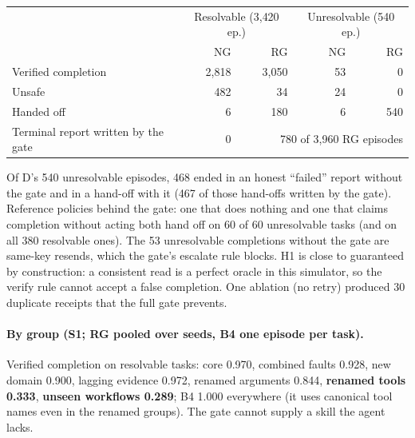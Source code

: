 \documentclass[11pt]{article}
\begin{document}
\begin{center}\footnotesize
\begin{tabular}{@{}lrrrr@{}}
\toprule
 & \multicolumn{2}{c}{Resolvable (3{,}420 ep.)} & \multicolumn{2}{c}{Unresolvable (540 ep.)} \\
 & NG & RG & NG & RG \\
\midrule
Verified completion & 2{,}818 & 3{,}050 & 53 & 0 \\
Unsafe & 482 & 34 & 24 & 0 \\
Handed off & 6 & 180 & 6 & 540 \\
Terminal report written by the gate & 0 & \multicolumn{3}{r}{780 of 3{,}960 RG episodes} \\
\bottomrule
\end{tabular}
\end{center}
Of D's 540 unresolvable episodes, 468 ended in an honest ``failed'' report without the gate and in a hand-off with it
(467 of those hand-offs written by the gate). Reference policies behind the gate: one that does nothing and one that
claims completion without acting both hand off on 60 of 60 unresolvable tasks (and on all 380 resolvable ones). The
53 unresolvable completions without the gate are same-key resends, which the gate's escalate rule blocks. H1 is close to
guaranteed by construction: a consistent read is a perfect oracle in this simulator, so the verify rule cannot accept a
false completion. One ablation (no retry) produced 30 duplicate receipts that the full gate prevents.

\paragraph{By group (S1; RG pooled over seeds, B4 one episode per task).} Verified completion on resolvable tasks:
core 0.970, combined faults 0.928, new domain 0.900, lagging evidence 0.972, renamed arguments 0.844,
\textbf{renamed tools 0.333}, \textbf{unseen workflows 0.289}; B4 1.000 everywhere (it uses canonical tool names even
in the renamed groups). The gate cannot supply a skill the agent lacks.
\end{document}
